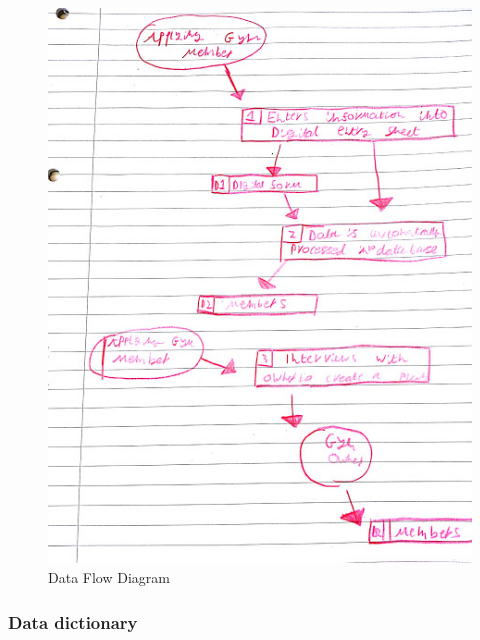 \begin{figure}[H]
    \includegraphics[width=\textwidth]{ProposedDFD2.jpg}
    \caption{Data Flow Diagram} \label{fig: Data Flow Diagram }
\end{figure}

\subsubsection{Data dictionary}

